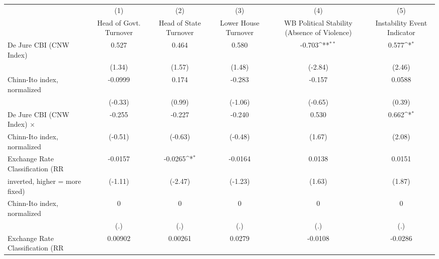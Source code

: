 {
\def\sym#1{\ifmmode^{#1}\else\(^{#1}\)\fi}
\begin{tabular}{l*{5}{c}}
\toprule
                                        &\multicolumn{1}{c}{(1)}&\multicolumn{1}{c}{(2)}&\multicolumn{1}{c}{(3)}&\multicolumn{1}{c}{(4)}&\multicolumn{1}{c}{(5)}\\
                                        &\multicolumn{1}{c}{Head of Govt. Turnover}&\multicolumn{1}{c}{Head of State Turnover}&\multicolumn{1}{c}{Lower House Turnover}&\multicolumn{1}{c}{WB Political Stability (Absence of Violence)}&\multicolumn{1}{c}{Instability Event Indicator}\\
\midrule
De Jure CBI (CNW Index)                 &     0.527         &     0.464         &     0.580         &    -0.703\sym{**} &     0.577\sym{*}  \\
                                        &    (1.34)         &    (1.57)         &    (1.48)         &   (-2.84)         &    (2.46)         \\
\addlinespace
Chinn-Ito index, normalized             &   -0.0999         &     0.174         &    -0.283         &    -0.157         &    0.0588         \\
                                        &   (-0.33)         &    (0.99)         &   (-1.06)         &   (-0.65)         &    (0.39)         \\
\addlinespace
De Jure CBI (CNW Index) $\times$        &    -0.255         &    -0.227         &    -0.240         &     0.530         &     0.662\sym{*}  \\
Chinn-Ito index, normalized             &   (-0.51)         &   (-0.63)         &   (-0.48)         &    (1.67)         &    (2.08)         \\
\addlinespace
Exchange Rate Classification (RR        &   -0.0157         &   -0.0265\sym{*}  &   -0.0164         &    0.0138         &    0.0151         \\
inverted, higher = more fixed)          &   (-1.11)         &   (-2.47)         &   (-1.23)         &    (1.63)         &    (1.87)         \\
\addlinespace
Chinn-Ito index, normalized             &         0         &         0         &         0         &         0         &         0         \\
                                        &       (.)         &       (.)         &       (.)         &       (.)         &       (.)         \\
\addlinespace
Exchange Rate Classification (RR        &   0.00902         &   0.00261         &    0.0279         &   -0.0108         &   -0.0286         \\

\end{tabular}}
